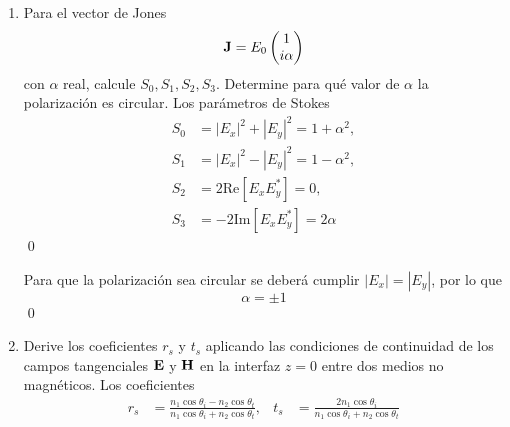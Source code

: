 \documentclass[]{article}
\numberwithin{equation}{section}
\begin{document}
\begin{enumerate}
\begin{equation*}
		\frac{E_y^2}{a_y^2} - 2\frac{E_x E_y}{a_x a_y}\cos\Delta + \frac{E_x^2}{a_x^2}\cos^2\!\Delta = \left(1 - \frac{E_x^2}{a_x^2}\right)\sin^2\!\Delta
	\end{equation*}
	Expandiendo a la derecha y moviendo $\frac{E_x^2}{a_x^2}\sin^2\Delta$ a la izquierda
	\begin{equation*}
		\frac{E_y^2}{a_y^2} - 2\frac{E_x E_y}{a_x a_y}\cos\Delta + \frac{E_x^2}{a_x^2}\underbrace{(\cos^2\!\Delta + \sin^2\!\Delta)}_{=\,1} = \sin^2\!\Delta
	\end{equation*}
	\begin{equation*}
		\Rightarrow \frac{E_x^2}{a_x^2} + \frac{E_y^2}{a_y^2} - 2\frac{E_x E_y}{a_x a_y}\cos\Delta = \sin^2\!\Delta
	\end{equation*}
	\qed
	
	\item Para el vector de Jones
	\begin{equation}
		\mathbf{J} = E_0 \begin{pmatrix}
			1\\
			i\alpha
		\end{pmatrix}
	\end{equation}
	con $\alpha$ real, calcule $S_0, S_1, S_2, S_3$. Determine para qué valor de $\alpha$ la polarización es circular.
	\resp Los parámetros de Stokes
	\begin{align}
		S_0 &= |E_x|^2 + |E_y|^2 = 1 + \alpha^2,\\
		S_1 &= |E_x|^2 - |E_y|^2 = 1 - \alpha^2,\\
		S_2 &=  2 \mathrm{Re}\!\left[E_x E_y^*\right] = 0,\\
		S_3 &= -2 \mathrm{Im}\!\left[E_x E_y^*\right] = 2\alpha
	\end{align}
	\qed
	
	Para que la polarización sea circular se deberá cumplir $|E_x| = |E_y|$, por lo que
	\begin{equation*}
		\alpha = \pm 1
	\end{equation*}
	\qed
	
	\item Derive los coeficientes $r_s$ y $t_s$ aplicando las condiciones de continuidad de los campos tangenciales $\mathbf{E}$ y $\mathbf{H}$ en la interfaz $z = 0$ entre dos medios no magnéticos.
	\resp Los coeficientes
	\begin{align}
		r_s &= \frac{n_1\cos\theta_{i} - n_2\cos\theta_{t}}{n_1\cos\theta_{i} + n_2\cos\theta_{t}}, & t_s &= \frac{2 n_1 \cos\theta_{i}}{n_1\cos\theta_{i} + n_2\cos\theta_{t}}
	\end{align}
	

\end{enumerate}
\end{document}
